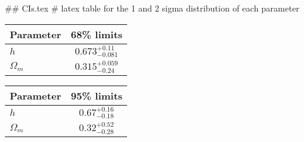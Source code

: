 ## CIs.tex
# latex table for the 1 and 2 sigma distribution of each parameter

\begin{tabular} { l  c}
 Parameter &  68\% limits\\
\hline
{\boldmath$h              $} & $0.673^{+0.11}_{-0.081}    $\\
{\boldmath$\Omega_m       $} & $0.315^{+0.059}_{-0.24}    $\\
\hline
\end{tabular}

\begin{tabular} { l  c}
 Parameter &  95\% limits\\
\hline
{\boldmath$h              $} & $0.67^{+0.16}_{-0.18}      $\\
{\boldmath$\Omega_m       $} & $0.32^{+0.52}_{-0.28}      $\\
\hline
\end{tabular}
